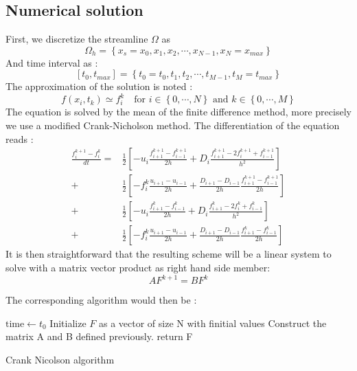 \documentclass[10pt,a4paper,twocolumn]{article}
\begin{document}
\subsection{Numerical solution}
First, we discretize the streamline $\Omega$ as \[\Omega_h = \left\lbrace x_s = x_0, x_1, x_2, \cdots, x_{N-1}, x_N = x_{max} \right\rbrace \]
And time interval as : 
\[[t_0, t_{max}] = \left\lbrace t_0 = t_0, t_1, t_2, \cdots, t_{M-1}, t_M = t_{max} \right\rbrace \]
The approximation of the solution is noted :
 \[f(x_i, t_k) \simeq f_i^k \: \: \:   \text{    for } i \in \left\lbrace 0, \cdots, N\right\rbrace  \text{ and } k \in \left\lbrace 0, \cdots, M \right\rbrace  \]
The equation is solved by the mean of the finite difference method, more precisely we use a modified Crank-Nicholson method. The differentiation of the equation reads : 
\useshortskip
\begin{align*}\label{eq:CrankNicolson}
\frac{f_i^{k+1} - f_i^{k}}{dt} =& \frac{1}{2} \left[ - u_i \frac{f_{i+1}^{k+1} - f_{i-1}^{k+1}}{2h} 
				+ D_i \frac{f_{i+1}^{k+1} - 2 f_{i}^{k+1} + f_{i-1}^{k+1}}{h^{2}}  \right] \\
				+& \frac{1}{2} \left[-f_i^k \frac{u_{i+1} - u_{i-1} }{2h}
				+ \frac{D_{i+1} - D_{i-1} }{2h} \frac{f_{i+1}^{k+1} - f_{i-1}^{k+1}}{2h} \right] \\ 								
				+ &\frac{1}{2} \left[ - u_i \frac{f_{i+1}^{k} - f_{i-1}^{k}}{2h} 
				+ D_i \frac{f_{i+1}^{k} - 2 f_{i}^{k} + f_{i-1}^{k}}{h^{2}} \right] \\
				+ &\frac{1}{2} \left[-f_i^k \frac{u_{i+1} - u_{i-1} }{2h}
				+ \frac{D_{i+1} - D_{i-1} }{2h} \frac{f_{i+1}^{k} - f_{i-1}^{k}}{2h} \right] \
\end{align*}
It is then straightforward that the resulting scheme will be a linear system to solve with a matrix vector product as right hand side member: 
\[ A F^{k+1} = B F^k\]

The corresponding algorithm would then be :

\IncMargin{1em}
\begin{algorithm}[h]
	\BlankLine
	$\text{time} \leftarrow  t_0$ \;
	Initialize $F$ as a vector of size N with f{initial} values\;
	Construct the matrix A and B defined previously.
	\BlankLine
	\BlankLine
	return F
	
	
\caption{Crank Nicolson algorithm}\label{alg:cn}
\end{algorithm}
\DecMargin{1em}
\end{document}
